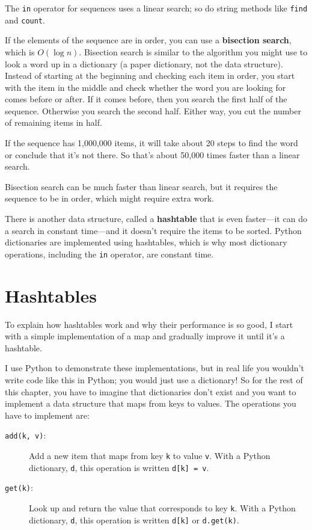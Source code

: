 \documentclass[10pt]{book}
\begin{document}
The {\tt in} operator for sequences uses a linear search; so do string
methods like {\tt find} and {\tt count}.

If the elements of the sequence are in order, you can use a {\bf
  bisection search}, which is $O(\log n)$.  Bisection search is
similar to the algorithm you might use to look a word up in a
dictionary (a paper dictionary, not the data structure).  Instead of
starting at the beginning and checking each item in order, you start
with the item in the middle and check whether the word you are looking
for comes before or after.  If it comes before, then you search the
first half of the sequence.  Otherwise you search the second half.
Either way, you cut the number of remaining items in half.

If the sequence has 1,000,000 items, it will take about 20 steps to
find the word or conclude that it's not there.  So that's about 50,000
times faster than a linear search.

Bisection search can be much faster than linear search, but
it requires the sequence to be in order, which might require
extra work.

There is another data structure, called a {\bf hashtable} that
is even faster---it can do a search in constant time---and it
doesn't require the items to be sorted.  Python dictionaries
are implemented using hashtables, which is why most dictionary
operations, including the {\tt in} operator, are constant time.


\section{Hashtables}
\label{hashtable}

To explain how hashtables work and why their performance is so
good, I start with a simple implementation of a map and
gradually improve it until it's a hashtable.

I use Python to demonstrate these implementations, but in real
life you wouldn't write code like this in Python; you would just use a
dictionary!  So for the rest of this chapter, you have to imagine that
dictionaries don't exist and you want to implement a data structure
that maps from keys to values.  The operations you have to
implement are:

\begin{description}

\item[{\tt add(k, v)}:] Add a new item that maps from key {\tt k}
to value {\tt v}.  With a Python dictionary, {\tt d}, this operation
is written {\tt d[k] = v}.

\item[{\tt get(k)}:] Look up and return the value that corresponds
to key {\tt k}.  With a Python dictionary, {\tt d}, this operation
is written {\tt d[k]} or {\tt d.get(k)}.

\end{description}
\end{document}
